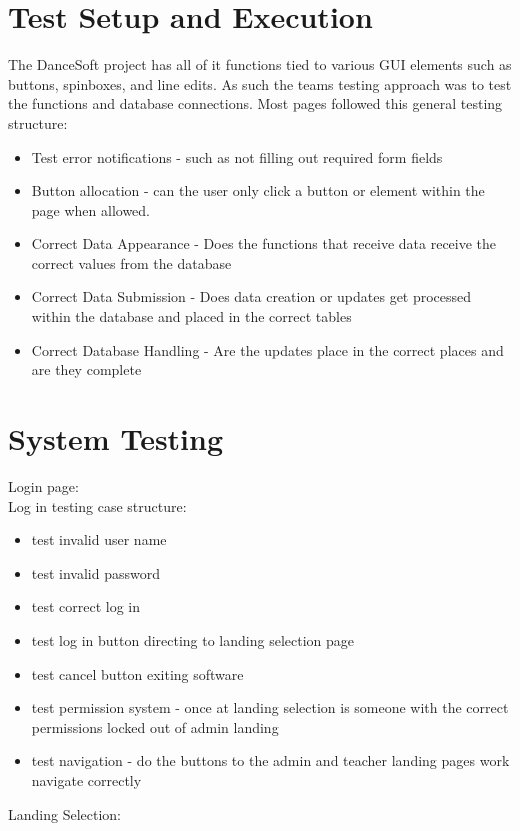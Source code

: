 \section{Test Setup and Execution}
The DanceSoft project has all of it functions tied to various GUI elements such as buttons, spinboxes, and line edits. As such the teams testing approach was to test the functions and database connections. Most pages followed this general testing structure:

\begin{itemize}
\item Test error notifications - such as not filling out required form fields
\item Button allocation - can the user only click a button or element within the page when allowed.
\item Correct Data Appearance - Does the functions that receive data receive the correct values from the database
\item Correct Data Submission - Does data creation or updates get processed within the database and placed in the correct tables
\item Correct Database Handling - Are the updates place in the correct places and are they complete
\end{itemize}


\section{System Testing}

Login page:\\

Log in testing case structure:
\begin{itemize}
\item test invalid user name
\item test invalid password
\item test correct log in 
\item test log in button directing to landing selection page
\item test cancel button exiting software
\item test permission system - once at landing selection is someone with the correct permissions locked out of admin landing
\item test navigation - do the buttons to the admin and teacher landing pages work navigate correctly
\end{itemize}

Landing Selection:\\

